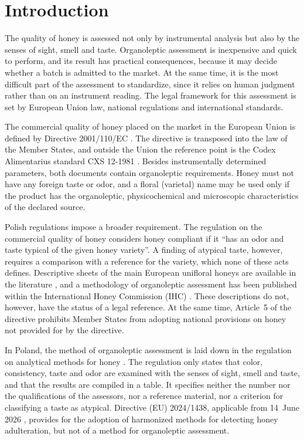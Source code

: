 \section{Introduction}

The quality of honey is assessed not only by instrumental analysis but also
by the senses of sight, smell and taste. Organoleptic assessment is
inexpensive and quick to perform, and its result has practical consequences,
because it may decide whether a batch is admitted to the market. At the same
time, it is the most difficult part of the assessment to standardize, since
it relies on human judgment rather than on an instrument reading. The legal
framework for this assessment is set by European Union law, national
regulations and international standards.

The commercial quality of honey placed on the market in the European Union is
defined by Directive 2001/110/EC \cite{Dyrektywa2001110}. The directive is
transposed into the law of the Member States, and outside the Union the
reference point is the Codex Alimentarius standard CXS 12-1981
\cite{CodexHoney}. Besides instrumentally determined parameters, both
documents contain organoleptic requirements. Honey must not have any foreign
taste or odor, and a floral (varietal) name may be used only if the product
has the organoleptic, physicochemical and microscopic characteristics of the
declared source.

Polish regulations impose a broader requirement. The regulation on the
commercial quality of honey \cite{RozporzadzenieMRiRW2003} considers honey
compliant if it ``has an odor and taste typical of the given honey variety''.
A finding of atypical taste, however, requires a comparison with a reference
for the variety, which none of these acts defines. Descriptive sheets of the
main European unifloral honeys are available in the literature
\cite{PersanoOddo2004}, and a methodology of organoleptic assessment has been
published within the International Honey Commission (IHC) \cite{Piana2004}.
These descriptions do not, however, have the status of a legal reference. At
the same time, Article~5 of the directive \cite{Dyrektywa2001110} prohibits
Member States from adopting national provisions on honey not provided for by
the directive.

In Poland, the method of organoleptic assessment is laid down in the
regulation on analytical methods for honey \cite{RozporzadzenieMRiRW2009}.
The regulation only states that color, consistency, taste and odor are
examined with the senses of sight, smell and taste, and that the results are
compiled in a table. It specifies neither the number nor the qualifications of
the assessors, nor a reference material, nor a criterion for classifying a
taste as atypical. Directive (EU) 2024/1438, applicable from 14~June 2026
\cite{Dyrektywa20241438}, provides for the adoption of harmonized methods for
detecting honey adulteration, but not of a method for organoleptic
assessment.

